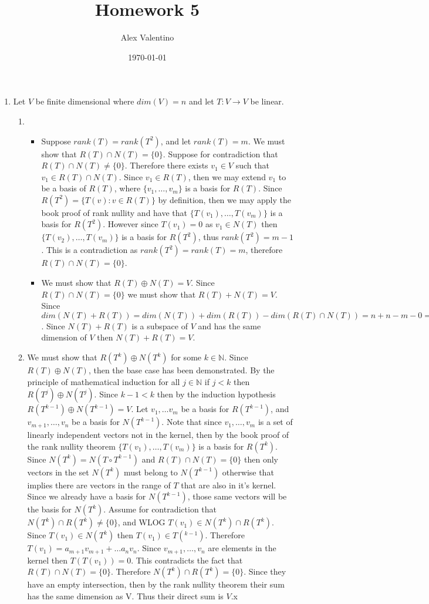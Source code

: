 \documentclass[12pt, letterpaper]{article}
\date{\today}
\author{Alex Valentino}
\title{Homework 5}
\newcommand{\N}{\mathbb{N}}
\begin{document}
\begin{enumerate}
	\item Let $V$ be finite dimensional where $dim(V) = n$ and let $T: V \to V$ be linear.
	\begin{enumerate}
		\item \begin{itemize}
		\item Suppose $rank(T) = rank(T^2)$, and let $rank(T) = m$.  We must show that $R(T) \cap N(T) = \{0\}$.
			Suppose for contradiction that $R(T) \cap N(T) \neq \{0\}$.  Therefore there exists $v_1 \in V$ such that $v_1 \in R(T) \cap N(T)$.
			Since $v_1 \in R(T)$, then we may extend $v_1$ to be a basis of $R(T)$, where $\{v_1,\ldots,v_m\}$ is a basis for $R(T)$.  Since $R(T^2) = \{T(v) : v \in R(T)\}$ by definition, then we may apply the book proof of rank nullity and have that $\{T(v_1),\ldots,T(v_m)\}$ is a basis for $R(T^2)$.  However since $T(v_1) = 0$ as $v_1 \in N(T)$ then $\{T(v_2),\ldots,T(v_m)\}$ is a basis for $R(T^2)$, thus $rank(T^2) = m -1$.  This is a contradiction as $rank(T^2) = rank(T) = m$, therefore $R(T) \cap N(T) = \{0\}$.  
		\item We must show that $R(T) \oplus N(T) = V$. Since $R(T) \cap N(T) = \{0\}$ we must show that $R(T) + N(T) = V$.  Since $dim(N(T) + R(T)) = dim(N(T))+dim(R(T)) - dim(R(T) \cap N(T)) = n + n - m - 0 = n$.  Since $N(T) + R(T)$ is a subspace of $V$ and has the same dimension of $V$ then $N(T) + R(T) = V.$
		\end{itemize}
 		\item We must show that $R(T^k) \oplus N(T^k)$ for some $k\in \N$.  Since $R(T) \oplus N(T)$, then the base case has been demonstrated.  By the principle of mathematical induction for all $j \in \N$ if $j < k$ then $R(T^j) \oplus N(T^j)$.  Since $k -1 < k$ then by the induction hypothesis $R(T^{k-1}) \oplus N(T^{k-1}) = V$.  Let $v_1,\ldots v_m$ be a basis for $R(T^{k-1})$, and $v_{m+1},\ldots,v_{n}$ be a basis for $N(T^{k-1})$.  Note that since $v_1,\ldots,v_m$ is a set of linearly independent vectors not in the kernel, then by the book proof of the rank nullity theorem $\{T(v_1),\ldots,T(v_m)\}$ is a basis for $R(T^k)$.  		Since $N(T^k) = N(T \circ T^{k-1})$ and $R(T) \cap N(T) = \{0\}$ then only vectors in the set $N(T^k)$ must belong to $N(T^{k-1})$ otherwise that implies there are vectors in the range of $T$ that are also in it's kernel.  Since we already have a basis for $N(T^{k-1})$, those same vectors will be the basis for $N(T^k)$. 	Assume for contradiction that $N(T^k) \cap R(T^k) \neq \{0\}$, and WLOG $T(v_1) \in N(T^k) \cap R(T^k)$.  Since $T(v_1) \in N(T^k)$ then $T(v_1) \in T(^{k-1})$.  Therefore $T(v_1) = a_{m+1}v_{m+1} + \ldots a_n v_n.$  Since $v_{m+1},\ldots,v_n$ are elements in the kernel then $T(T(v_1)) = 0$.  This contradicts the fact that $R(T) \cap N(T) = \{0\}$.  Therefore $N(T^k) \cap R(T^k) = \{0\}$.  Since they have an empty intersection, then by the rank nullity theorem their sum has the same dimension as V.  Thus their direct sum is $V$.x
 		

\end{enumerate}
\end{enumerate}
\end{document}
